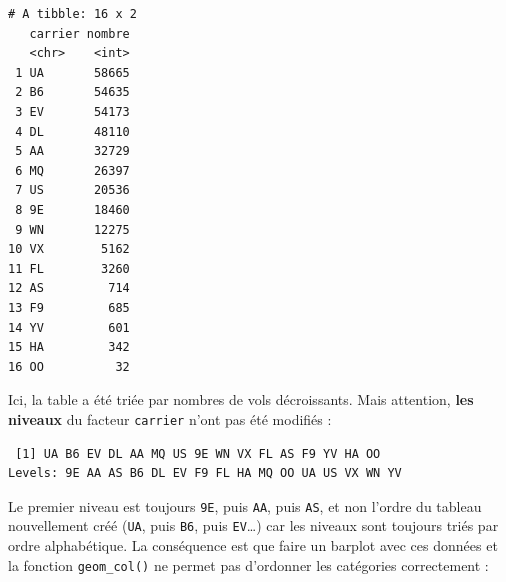 \documentclass[a4paperpaper,]{article}
\newenvironment{Shaded}{\begin{snugshade}}{\end{snugshade}}
\newcommand{\CommentTok}[1]{\textcolor[rgb]{0.54,0.53,0.53}{#1}}
\newcommand{\DataTypeTok}[1]{\textcolor[rgb]{0.00,0.34,0.68}{#1}}
\newcommand{\KeywordTok}[1]{\textcolor[rgb]{0.12,0.11,0.11}{\textbf{#1}}}
\newcommand{\NormalTok}[1]{\textcolor[rgb]{0.12,0.11,0.11}{#1}}
\newcommand{\OperatorTok}[1]{\textcolor[rgb]{0.12,0.11,0.11}{#1}}
\newcommand{\StringTok}[1]{\textcolor[rgb]{0.75,0.01,0.01}{#1}}
\begin{document}
\begin{Shaded}
\end{Shaded}

\begin{verbatim}
# A tibble: 16 x 2
   carrier nombre
   <chr>    <int>
 1 UA       58665
 2 B6       54635
 3 EV       54173
 4 DL       48110
 5 AA       32729
 6 MQ       26397
 7 US       20536
 8 9E       18460
 9 WN       12275
10 VX        5162
11 FL        3260
12 AS         714
13 F9         685
14 YV         601
15 HA         342
16 OO          32
\end{verbatim}

Ici, la table a été triée par nombres de vols décroissants. Mais attention, \textbf{les niveaux} du facteur \texttt{carrier} n'ont pas été modifiés :

\begin{Shaded}
\end{Shaded}

\begin{verbatim}
 [1] UA B6 EV DL AA MQ US 9E WN VX FL AS F9 YV HA OO
Levels: 9E AA AS B6 DL EV F9 FL HA MQ OO UA US VX WN YV
\end{verbatim}

Le premier niveau est toujours \texttt{9E}, puis \texttt{AA}, puis \texttt{AS}, et non l'ordre du tableau nouvellement créé (\texttt{UA}, puis \texttt{B6}, puis \texttt{EV}\ldots{}) car les niveaux sont toujours triés par ordre alphabétique. La conséquence est que faire un barplot avec ces données et la fonction \texttt{geom\_col()} ne permet pas d'ordonner les catégories correctement :
\end{document}
